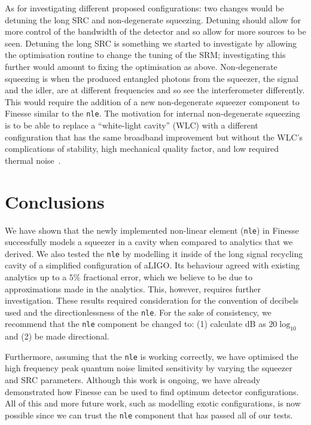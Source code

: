 \documentclass[aps,pra,superscriptaddress,reprint,nofootinbib]{revtex4-1}
\newcommand{\code}[1]{\texttt{#1}}
\begin{document}
As for investigating different proposed configurations: two changes would be detuning the long SRC and non-degenerate squeezing. Detuning should allow for more control of the bandwidth of the detector and so allow for more sources to be seen.
Detuning the long SRC is something we started to investigate by allowing the optimisation routine to change the tuning of the SRM; investigating this further would amount to fixing the optimisation as above.
Non-degenerate squeezing is when the produced entangled photons from the squeezer, the signal and the idler, are at different frequencies and so see the interferometer differently. This would require the addition of a new non-degenerate squeezer component to Finesse similar to the \code{nle}. The motivation for internal non-degenerate squeezing is to be able to replace a ``white-light cavity'' (WLC) with a different configuration that has the same broadband improvement but without the WLC’s complications of stability, high mechanical quality factor, and low required thermal noise~\cite{white-light-resonators}.




\section{Conclusions}
\label{sec:conclusions}

We have shown that the newly implemented non-linear element (\code{nle}) in Finesse successfully models a squeezer in a cavity when compared to analytics that we derived.
We also tested the \code{nle} by modelling it inside of the long signal recycling cavity of a simplified configuration of aLIGO. Its behaviour agreed with existing analytics up to a $5\%$ fractional error, which we believe to be due to approximations made in the analytics. This, however, requires further investigation. These results required consideration for the convention of decibels used and the directionlessness of the \code{nle}. For the sake of consistency, we recommend that the \code{nle} component be changed to: (1) calculate dB as $20 \log_{10}$ and (2) be made directional.

Furthermore, assuming that the \code{nle} is working correctly, we have optimised the high frequency peak quantum noise limited sensitivity by varying the squeezer and SRC parameters. Although this work is ongoing, we have already demonstrated how Finesse can be used to find optimum detector configurations. All of this and more future work, such as modelling exotic configurations, is now possible since we can trust the \code{nle} component that has passed all of our tests.
\end{document}
